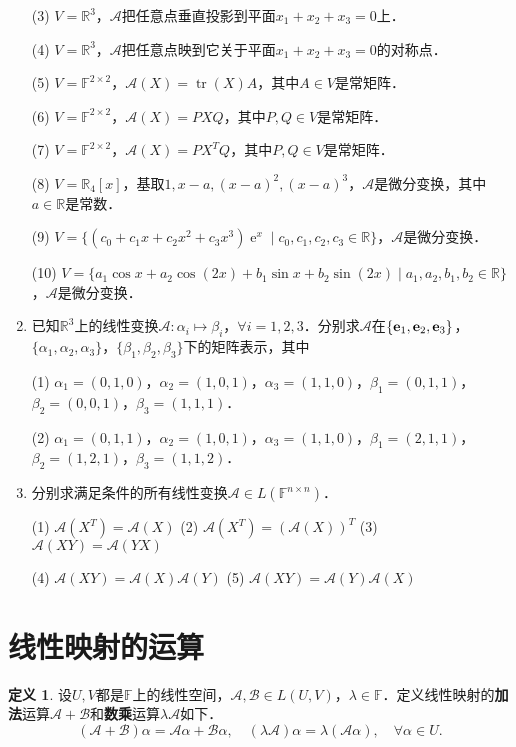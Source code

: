 \documentclass[a4paper,fontset=windows]{ctexbook}
\theoremstyle{definition}
\newtheorem{definition}{定义}[chapter]
\DeclareMathOperator{\E}{e}
\DeclareMathOperator{\tr}{tr}
\begin{document}
\begin{enumerate}
(3) $V=\mathbb{R}^3$，$\mathcal{A}$把任意点垂直投影到平面$x_1+x_2+x_3=0$上．

(4) $V=\mathbb{R}^3$，$\mathcal{A}$把任意点映到它关于平面$x_1+x_2+x_3=0$的对称点．

(5) $V=\mathbb{F}^{2\times 2}$，$\mathcal{A}(X)=\tr(X)A$，其中$A\in V$是常矩阵．

(6) $V=\mathbb{F}^{2\times 2}$，$\mathcal{A}(X)=PXQ$，其中$P,Q\in V$是常矩阵．

(7) $V=\mathbb{F}^{2\times 2}$，$\mathcal{A}(X)=PX^TQ$，其中$P,Q\in V$是常矩阵．

(8) $V=\mathbb{R}_4[x]$，基取$1,x-a,(x-a)^2,(x-a)^3$，$\mathcal{A}$是微分变换，其中$a\in\mathbb{R}$是常数．

(9) $V=\{(c_0+c_1x+c_2x^2+c_3x^3)\E^x\mid c_0,c_1,c_2,c_3\in\mathbb{R}\}$，$\mathcal{A}$是微分变换．

(10) $V=\{a_1\cos x+a_2\cos(2x)+b_1\sin x+b_2\sin(2x)\mid a_1,a_2,b_1,b_2\in\mathbb{R}\}$，$\mathcal{A}$是微分变换．

\item 已知$\mathbb{R}^3$上的线性变换$\mathcal{A}:\alpha_i\mapsto\beta_i$，$\forall i=1,2,3$．分别求$\mathcal{A}$在$\{{\bf e}_1,{\bf e}_2,{\bf e}_3\}$，$\{\alpha_1,\alpha_2,\alpha_3\}$，$\{\beta_1,\beta_2,\beta_3\}$下的矩阵表示，其中

(1) $\alpha_1=(0,1,0)$，$\alpha_2=(1,0,1)$，$\alpha_3=(1,1,0)$，$\beta_1=(0,1,1)$，$\beta_2=(0,0,1)$，$\beta_3=(1,1,1)$．

(2) $\alpha_1=(0,1,1)$，$\alpha_2=(1,0,1)$，$\alpha_3=(1,1,0)$，$\beta_1=(2,1,1)$，$\beta_2=(1,2,1)$，$\beta_3=(1,1,2)$．

\item 分别求满足条件的所有线性变换$\mathcal{A}\in L(\mathbb{F}^{n\times n})$．

(1) $\mathcal{A}(X^T)=\mathcal{A}(X)$ \hspace{45pt}
(2) $\mathcal{A}(X^T)=(\mathcal{A}(X))^T$ \qquad\qquad
(3) $\mathcal{A}(XY)=\mathcal{A}(YX)$

(4) $\mathcal{A}(XY)=\mathcal{A}(X)\mathcal{A}(Y)$ \qquad
(5) $\mathcal{A}(XY)=\mathcal{A}(Y)\mathcal{A}(X)$

\end{enumerate}

\clearpage\section{线性映射的运算}

\begin{definition}
设$U,V$都是$\mathbb{F}$上的线性空间，$\mathcal{A,B}\in L(U,V)$，$\lambda\in\mathbb{F}$．定义线性映射的{\bf 加法}运算$\mathcal{A+B}$和{\bf 数乘}运算$\lambda\mathcal{A}$如下．
$$(\mathcal{A+B})\alpha=\mathcal{A}\alpha+\mathcal{B}\alpha,\quad(\lambda\mathcal{A})\alpha=\lambda(\mathcal{A}\alpha),\quad\forall\alpha\in U.$$
\end{definition}
\end{document}
